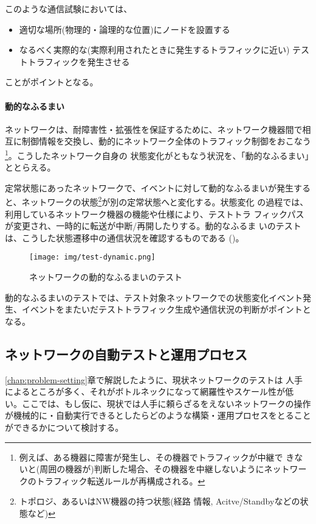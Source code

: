 このような通信試験においては、
\begin{itemize}
 \item 適切な場所(物理的・論理的な位置)にノードを設置する
 \item なるべく実際的な(実際利用されたときに発生するトラフィックに近い)
       テストトラフィックを発生させる
\end{itemize}
ことがポイントとなる。

    \paragraph{動的なふるまい}
ネットワークは、耐障害性・拡張性を保証するために、ネットワーク機器間で相
互に制御情報を交換し、動的にネットワーク全体のトラフィック制御をおこなう
\footnote{例えば、ある機器に障害が発生し、その機器でトラフィックが中継で
きないと(周囲の機器が)判断した場合、その機器を中継しないようにネットワー
クのトラフィック転送ルールが再構成される。}。こうしたネットワーク自身の
状態変化がともなう状況を、「動的なふるまい」ととらえる。

定常状態にあったネットワークで、イベントに対して動的なふるまいが発生する
と、ネットワークの状態\footnote{トポロジ、あるいはNW機器の持つ状態(経路
情報, Acitve/Standbyなどの状態など)}が別の定常状態へと変化する。状態変化
の過程では、利用しているネットワーク機器の機能や仕様により、テストトラ
フィックパスが変更され、一時的に転送が中断/再開したりする。動的なふるま
いのテストは、こうした状態遷移中の通信状況を確認するものである
()。
\begin{figure}[h]
 \centering
 \texttt{[image: img/test-dynamic.png]}
 \caption{ネットワークの動的なふるまいのテスト}
 \label{fig:test-dynamic}
\end{figure}

動的なふるまいのテストでは、テスト対象ネットワークでの状態変化イベント発
生、イベントをまたいだテストトラフィック生成や通信状況の判断がポイントと
なる。

  \subsection{ネットワークの自動テストと運用プロセス}
  \label{sec:network-test-and-process}


\ref{chap:problem-setting}章で解説したように、現状ネットワークのテストは
人手によるところが多く、それがボトルネックになって網羅性やスケール性が低
い。ここでは、もし仮に、現状では人手に頼らざるをえないネットワークの操作
が機械的に・自動実行できるとしたらどのような構築・運用プロセスをとること
ができるかについて検討する。

